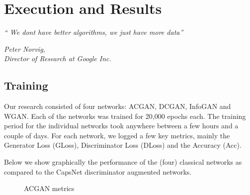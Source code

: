 \chapter{Execution and Results}\label{ch:execandresults}
\epigraph{\textit{ \normalsize“ We dont have better algorithms, we just have more data”}}{\normalsize\textit{Peter Norvig,\\ Director of Research at Google Inc.}}

\section{Training} %
\label{sec:training}

Our research consisted of four networks: ACGAN, DCGAN, InfoGAN and WGAN. Each of the networks was trained for 20,000 epochs each. The training period for the individual networks took anywhere between a few hours and a couple of days. For each network, we logged a few key metrics, mainly the Generator Loss (GLoss), Discriminator Loss (DLoss) and the Accuracy (Acc). 
\par\bigskip
Below we show graphically the performance of the (four) classical networks as compared to the CapsNet discriminator augmented networks.

\begin{figure}[H]
    \centering
    \qquad
    \caption{ACGAN metrics}%
    \label{fig:acgan_metric}%
\end{figure}


